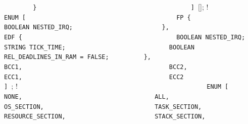 {{{{{{{\lstinline!        }                                    ! \newline
\lstinline!      ] ![];                  ! \newline
\lstinline!                                             ! \newline
\lstinline!      ENUM [                                 ! \newline
\lstinline!        FP {                                 ! \newline
\lstinline!          BOOLEAN NESTED_IRQ;                ! \newline
\lstinline!        },                                   ! \newline
\lstinline!        EDF {                                ! \newline
\lstinline!          BOOLEAN NESTED_IRQ;                ! \newline
\lstinline!          STRING TICK_TIME;                  ! \newline
\lstinline!          BOOLEAN REL_DEADLINES_IN_RAM = FALSE; ! \newline
\lstinline!        },                                   ! \newline
\lstinline!        BCC1,                                ! \newline
\lstinline!        BCC2,                                ! \newline
\lstinline!        ECC1,                                ! \newline
\lstinline!        ECC2                                 ! \newline
\lstinline!      ] !;            ! \newline
\lstinline!                                             ! \newline
\lstinline!      ENUM [                                 ! \newline
\lstinline!	   NONE,                                ! \newline
\lstinline!	   ALL,                                 ! \newline
\lstinline!	   OS_SECTION,                          ! \newline
\lstinline!	   TASK_SECTION,                        ! \newline
\lstinline!	   RESOURCE_SECTION,                    ! \newline
\lstinline!	   STACK_SECTION,                       ! \newline
}}}}}}}
